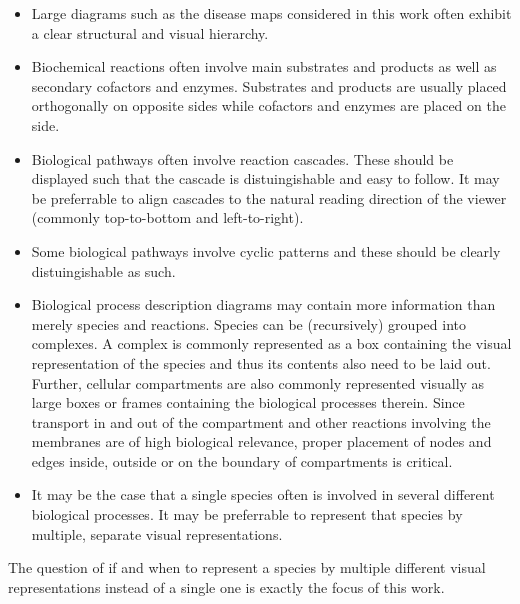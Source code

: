 \documentclass[
	fontsize=10pt, %
	twoside=false, %
	secnumdepth=1, %
  toc=indentunnumbered %
]{kaobook}
\begin{document}

\begin{itemize}
 \item Large diagrams such as the disease maps considered in this work often
   exhibit a clear structural and visual hierarchy.
 \item Biochemical reactions often involve main substrates and products as well
   as secondary cofactors and enzymes. Substrates and products are usually
   placed orthogonally on opposite sides while cofactors and enzymes are
   placed on the side.
 \item Biological pathways often involve reaction cascades. These should be
   displayed such that the cascade is distuingishable and easy to follow.
   It may be preferrable to align cascades to the natural reading direction of
   the viewer (commonly top-to-bottom and left-to-right).
 \item Some biological pathways involve cyclic patterns and these should be
   clearly distuingishable as such.
\item Biological process description diagrams may contain more information
  than merely species and reactions. Species can be (recursively) grouped
  into complexes. A complex is commonly represented as a box containing the
  visual representation of the species and thus its contents also need to be
  laid out. Further, cellular compartments are also commonly represented
  visually as large boxes or frames containing the biological processes
  therein. Since transport in and out of the compartment and other reactions
  involving the membranes are of high biological relevance, proper placement
  of nodes and edges inside, outside or on the boundary of compartments is critical.
\item It may be the case that a single species often is involved in several
  different biological processes. It may be preferrable to represent that
  species by multiple, separate visual representations.
\end{itemize}

The question of if and when to represent a species by multiple different visual
representations instead of a single one is exactly the focus of this work.
\end{document}
